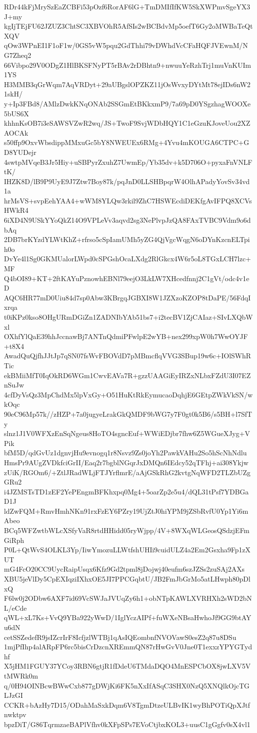 RDr44kFjMrySzEaZCBFi53pOzf6RorAF6lG+TmDMIfIfKW5SkXWPmvSgeYX3J+my
kgIjTEjFU62JZUZ3ChtSC3XBVOhR5AfSIs2wBCBdvMp5oefT6Gy2oMWBaTeQtXQV
qOw3WPnEI1F1oF1w/0GS5vW5pqu2GdThhi79vDWhdVcCFaHQFJVEwnM/NG7Zheq2
66Vibpo29V0ODgZ1HlBKSFNyPT5rBAv2rDBhtn9+nwuuYeRzhTrj1muVnKUIm1YS
H3MMB3qGrWqm7AqVRDyt+29aUBgslOPZKZ11jOsWvxyDYtMt78ejIDs6nW21skH/
y+Ip3FBd8/AMlzDwkKNqONAb2SSGmEtBKkxmP9/7a69pD0YSgzhagWOOXe5bUS6X
khhnKsOB7i3eSAWSVZwR2wq/JS+TwoF9SvjWDbHQY1C1eGzuKJoveUou2XZAOCAk
s50ffp9OxvWbsdippMMxuGc5bY8NWEUEx6RMg+4Yvu4mKOUGA6CTPC+GD8YUDejr
4swtpMVqeB3Jr5Hiy+uSBPyrZxuhZ7UwmEp/Yb35dv+k5D706O+pyxaFnVNLFtK/
IHZK8D/lB9P9UyE9J7Ztw7Boy87k/pqJnD0LLSHBpqrW4OlhAPadyYovSv34vd1a
hrMsVS+svpEehYAA4+wWM8YLQw3rkil9ZhC7HSWEcdiDEKfgAvIFPQ8XCVsHWkR4
6iXD4N9USkYYoQkZ14O9VPLeVv3aqvd2sg3NePlvpJzQA8FAxTVBC9Vdm9o6dbAq
2DB7brKYzdYLWtKhZ+rfrso5cSpIamUMh5yZG4QjVgcWqgN6oDYnKzcnELTpih0o
DvYe4l1Sg0GKMUalorLWpd0cSPGshOcaLXdg2RlGkcx4W6r5oL8TGxLCH7lzc+MF
Q4bOI89+KT+2ftKAYuPznowhEBNl79eejO3LkLW7XHcedfnnj2C1gVt/odc4v1eD
AQC6HR77mD0Uiu84d7sp0Abw3KBrgqJGBXI8W1JZXzoKZOP8tDaPE/56FdqIxrqa
t0iKPz0kso8OHgURmDGiZn1ZADNIbYAb51bs7+i2tecBV1ZjCAIaz+SIvLXQbWxl
OXhfYlQaE39hhJccnawBj7ANTnQdmiPFwlpE2wYB+nex299xpW0h7WwOYJF+t8X4
AwadQuQjfhJJtJp7qSN07fsWvFBOVdD7pMBmcflqVVG3SBup19w6c+IOlSWhRTic
ekBMiiMfT0IqOkRD6WGm1CwvEAVa7R+gzzUAAGiEyIRZxNLbxFZdU3I07EZnSuJw
4cfDyVsQz3MpChdMx5lpVxGy+O51HuKtRkEymucaoDqhjE6GEtpZWkVkSN/wkOqc
90eC96Mp57k//zHZP+7a0jugyeLrakGkQMDF9bWG7y7F0gt0k5B6/s5BH+l7SfTy
slnz1J1V0WFXzEnSqNgeus8HoTO4sgncEuf+WWiEDjbr7fhw6Z5WGueXJyg+VPik
bfM5D/qdGvUz1dgnvjHu9evnogq1r8Nsvz9Zs0joYh2PawkVAHu2So5hScNhNdlu
HmsPr9AUgZVDkfciGrII/Eaq2r7bgblNGqrJxDMQn6IEdcy52qTFhj+ai308Ykjw
zUiK/RGOm6/+ZtlJRadWLjFTJYrflmrE/aAjGSkRhG2kvtgNqWFD2TLZbUZgGRu2
i4JZMSTsTD1zEF2YePEngmBFKhxpq0Mg4+5oarZp2e5u4/dQL31tPsf7YDBGaD1J
ldZwFQM+RmvHmhNKn91rxFzEY6PZry19UjZtJ0hiYPM9jZSbRvfU0Yp1Yi6mAbeo
BCq5WFZwtbWLcXSfyVaR8rtdHHidd05ryWjpp/4V+8WXqWLGeosQSdzjEFmGiRph
P0L+QtWvS4OLKL3Yp/IiwYmozuLLWtfshUHIi9cuidULZ4a2Em2Gsxha9Fp1zXUT
mG4FcO20CC9UycRaipUsqx6Kfz9Gd2tpml8jDojwj40eufm6szJZSs2zuSAj2AXs
XBU5jeVlDy5CpEXIqziIXhxOE5JI7PPCGqbtU/JB2FmJbGrMo5atLHwph80pDlxQ
F6lw0j2ODbw6AXF7id69VcSWJaJVUqZy6h1+obNTpKAWLXVRHXh2sWD2bNL/eCde
qWL+xL7Ks+VvQ9YBa922yWwD/1IglYczAIPf+fuWXeNBsaHwhoJf9GG9btAYu6dN
cetSSZedefR9jsIZcrIrF8IcfjzlWTBj1qAsIQEombnfNVOVawS0esZ2q87u8DSu
1mjPfIhp4alARpFP6rc5bisCrDzcnXREmmQN87rHwGvV0Jne0T1exxzYPYGTydhf
X5jHM1FGUY37YCoy3RBN6gtjR1fDdeU6TMdaDQO4MnESPCbOX8jwLXV5VtMWRk0m
q/0H94OINBcwBWwCxb877gDWjKi6FK5nXxIfASqC3SHX0NzQ5XNQlkOjcTGLJzGI
CCKR+bAzHy7D15/ODahMaSxkDqm6V8TgmDtzeULBvIK1wyBhPOTiQpXJtfnwktpv
bpzDiT/G86TqrmzaeBAPlVfhv0kXFpSPs7EVoCtjbxKOL3+uusC1gGgfv0sX4vl1
